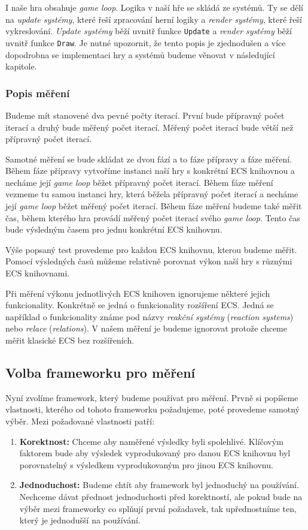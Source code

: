 I naše hra obsahuje \textit{game loop}. Logika v naší hře se skládá ze systémů. Ty se dělí na \textit{update systémy}, které řeší zpracování herní logiky a \textit{render systémy}, které řeší vykreslování. \textit{Update systémy} běží uvnitř funkce \texttt{Update} a \textit{render systémy} běží uvnitř funkce \texttt{Draw}. Je nutné upozornit, že tento popis je zjednodušen a více dopodrobna se implementaci hry a systémů budeme věnovat v následující kapitole.

\subsubsection{Popis měření}
Budeme mít stanovené dva pevné počty iterací. První bude přípravný počet iterací a druhý bude měřený počet iterací. Měřený počet iterací bude větší než přípravný počet iterací.

Samotné měření se bude skládat ze dvou fází a to fáze přípravy a fáze měření. Během fáze přípravy vytvoříme instanci naší hry s konkrétní ECS knihovnou a necháme její \textit{game loop} běžet přípravný počet iterací. Během fáze měření vezmeme tu samou instanci hry, která běžela přípravný počet iterací a necháme její \textit{game loop} běžet měřený počet iterací. Během fáze měření budeme také měřit čas, během kterého hra provádí měřený počet iterací svého \textit{game loop}. Tento čas bude výsledným časem pro jednu konkrétní ECS knihovnu.

Výše popsaný test provedeme pro každou ECS knihovnu, kterou budeme měřit. Pomocí výsledných časů můžeme relativně porovnat výkon naší hry s různými ECS knihovnami. 

Při měření výkonu jednotlivých ECS knihoven ignorujeme některé jejich funkcionality. Konkrétně se jedná o funkcionality rozšíření ECS. Jedná se například o funkcionality známe pod názvy \textit{reakční systémy} (\textit{reaction systems}) nebo \textit{relace} ({\textit{relations}}). V našem měření je budeme ignorovat protože chceme měřit klasické ECS bez rozšířeních.

\subsection{Volba frameworku pro měření}
\label{benchmark-framework}
Nyní zvolíme framework, který budeme používat pro měření. Prvně si popíšeme vlastnosti, kterého od tohoto frameworku požadujeme, poté provedeme samotný výběr. Mezi požadované vlastnosti patří:

\begin{enumerate}
    \item \textbf{Korektnost:} Chceme aby naměřené výsledky byli spolehlivé. Klíčovým faktorem bude aby výsledek vyprodukovaný pro danou ECS knihovnu byl porovnatelný s výsledkem vyprodukovaným pro jinou ECS knihovnu.
    \item \textbf{Jednoduchost:} Budeme chtít aby framework byl jednoduchý na používání. Nechceme dávat přednost jednoduchosti před korektností, ale pokud bude na výběr mezi frameworky co splňují první požadavek, tak upřednostníme ten, který je jednodušší na používání.
\end{enumerate}

